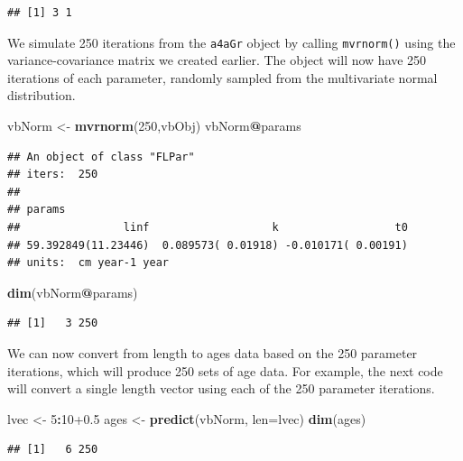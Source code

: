 \documentclass[
]{book}
\newenvironment{Shaded}{\begin{snugshade}}{\end{snugshade}}
\newcommand{\AttributeTok}[1]{\textcolor[rgb]{0.13,0.29,0.53}{#1}}
\newcommand{\DecValTok}[1]{\textcolor[rgb]{0.00,0.00,0.81}{#1}}
\newcommand{\FloatTok}[1]{\textcolor[rgb]{0.00,0.00,0.81}{#1}}
\newcommand{\FunctionTok}[1]{\textcolor[rgb]{0.13,0.29,0.53}{\textbf{#1}}}
\newcommand{\NormalTok}[1]{#1}
\newcommand{\OtherTok}[1]{\textcolor[rgb]{0.56,0.35,0.01}{#1}}
\newcommand{\SpecialCharTok}[1]{\textcolor[rgb]{0.81,0.36,0.00}{\textbf{#1}}}
\begin{document}
\begin{verbatim}
## [1] 3 1
\end{verbatim}

We simulate 250 iterations from the \texttt{a4aGr} object by calling \texttt{mvrnorm()} using the variance-covariance matrix we created earlier. The object will now have 250 iterations of each parameter, randomly sampled from the multivariate normal distribution.

\begin{Shaded}
\begin{Highlighting}[]
\NormalTok{vbNorm }\OtherTok{\textless{}{-}} \FunctionTok{mvrnorm}\NormalTok{(}\DecValTok{250}\NormalTok{,vbObj)}
\NormalTok{vbNorm}\SpecialCharTok{@}\NormalTok{params}
\end{Highlighting}
\end{Shaded}

\begin{verbatim}
## An object of class "FLPar"
## iters:  250 
## 
## params
##                linf                   k                  t0 
## 59.392849(11.23446)  0.089573( 0.01918) -0.010171( 0.00191) 
## units:  cm year-1 year
\end{verbatim}

\begin{Shaded}
\begin{Highlighting}[]
\FunctionTok{dim}\NormalTok{(vbNorm}\SpecialCharTok{@}\NormalTok{params)}
\end{Highlighting}
\end{Shaded}

\begin{verbatim}
## [1]   3 250
\end{verbatim}

We can now convert from length to ages data based on the 250 parameter iterations, which will produce 250 sets of age data. For example, the next code will convert a single length vector using each of the 250 parameter iterations.

\begin{Shaded}
\begin{Highlighting}[]
\NormalTok{lvec }\OtherTok{\textless{}{-}} \DecValTok{5}\SpecialCharTok{:}\DecValTok{10}\FloatTok{+0.5}
\NormalTok{ages }\OtherTok{\textless{}{-}} \FunctionTok{predict}\NormalTok{(vbNorm, }\AttributeTok{len=}\NormalTok{lvec)}
\FunctionTok{dim}\NormalTok{(ages)}
\end{Highlighting}
\end{Shaded}

\begin{verbatim}
## [1]   6 250
\end{verbatim}
\end{document}
